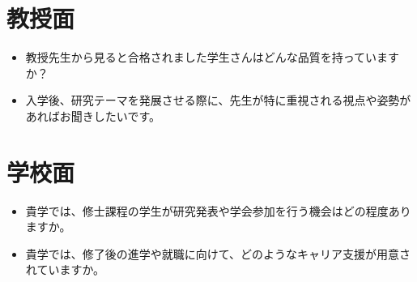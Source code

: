 \documentclass[xelatex,a4paper,base=11pt,ja=standard,jafont=noto]{bxjsreport}
\begin{document}
\section{教授面}
\begin{itemize}
    \item 教授先生から見ると合格されました学生さんはどんな品質を持っていますか？
\item 入学後、研究テーマを発展させる際に、先生が特に重視される視点や姿勢があればお聞きしたいです。
\end{itemize}
\section{学校面}
\begin{itemize}
    \item 貴学では、修士課程の学生が研究発表や学会参加を行う機会はどの程度ありますか。
\item 貴学では、修了後の進学や就職に向けて、どのようなキャリア支援が用意されていますか。
\end{itemize}
\end{document}
